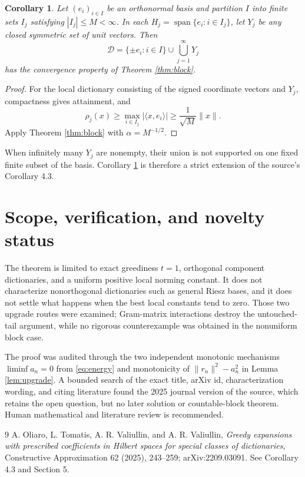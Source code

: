 \documentclass[11pt]{article}
\newtheorem{corollary}[theorem]{Corollary}
\newcommand{\D}{\mathcal D}
\begin{document}
\begin{corollary}\label{cor:coordinates}
Let $(e_i)_{i\in I}$ be an orthonormal basis and partition $I$ into finite
sets $I_j$ satisfying $|I_j|\le M<\infty$.  In each
$H_j=\operatorname{span}\{e_i:i\in I_j\}$, let $Y_j$ be any closed symmetric
set of unit vectors.  Then
\[
 \D=\{\pm e_i:i\in I\}\cup\bigcup_{j=1}^{\infty}Y_j
\]
has the convergence property of Theorem \ref{thm:block}.
\end{corollary}

\begin{proof}
For the local dictionary consisting of the signed coordinate vectors and
$Y_j$, compactness gives attainment, and
\[
 \rho_j(x)\ge\max_{i\in I_j}|\langle x,e_i\rangle|
 \ge\frac1{\sqrt M}\|x\|.
\]
Apply Theorem \ref{thm:block} with $\alpha=M^{-1/2}$.
\end{proof}

When infinitely many $Y_j$ are nonempty, their union is not supported on one
fixed finite subset of the basis.  Corollary \ref{cor:coordinates} is therefore
a strict extension of the source's Corollary 4.3.

\section{Scope, verification, and novelty status}

The theorem is limited to exact greediness $t=1$, orthogonal component
dictionaries, and a uniform positive local norming constant.  It does not
characterize nonorthogonal dictionaries such as general Riesz bases, and it
does not settle what happens when the best local constants tend to zero.
Those two upgrade routes were examined; Gram-matrix interactions destroy the
untouched-tail argument, while no rigorous counterexample was obtained in the
nonuniform block case.

The proof was audited through the two independent monotonic mechanisms
$\liminf a_n=0$ from \eqref{eq:energy} and monotonicity of
$\|r_n\|^2-a_n^2$ in Lemma \ref{lem:upgrade}.  A bounded search of the exact
title, arXiv id, characterization wording, and citing literature found the
2025 journal version of the source, which retains the open question, but no
later solution or countable-block theorem.  Human mathematical and literature
review is recommended.

\begin{thebibliography}{9}
A. Oliaro, L. Tomatis, A. R. Valiullin, and A. R. Valiullin,
\emph{Greedy expansions with prescribed coefficients in Hilbert spaces for
special classes of dictionaries}, Constructive Approximation 62 (2025),
243--259; arXiv:2209.03091.  See Corollary 4.3 and Section 5.
\end{thebibliography}
\end{document}
